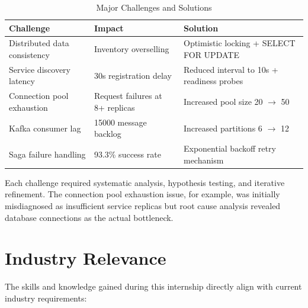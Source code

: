 \begin{table}[h]
\centering
\caption{Major Challenges and Solutions}
\begin{tabular}{|p{4cm}|p{3.5cm}|p{4cm}|}
\hline
\textbf{Challenge} & \textbf{Impact} & \textbf{Solution} \\
\hline
Distributed data consistency & Inventory overselling & Optimistic locking + SELECT FOR UPDATE \\
\hline
Service discovery latency & 30s registration delay & Reduced interval to 10s + readiness probes \\
\hline
Connection pool exhaustion & Request failures at 8+ replicas & Increased pool size 20 \(\rightarrow\) 50 \\
\hline
Kafka consumer lag & 15000 message backlog & Increased partitions 6 \(\rightarrow\) 12 \\
\hline
Saga failure handling & 93.3\% success rate & Exponential backoff retry mechanism \\
\hline
\end{tabular}
\end{table}

Each challenge required systematic analysis, hypothesis testing, and iterative refinement. The connection pool exhaustion issue, for example, was initially misdiagnosed as insufficient service replicas but root cause analysis revealed database connections as the actual bottleneck.

\section{Industry Relevance}

The skills and knowledge gained during this internship directly align with current industry requirements:

